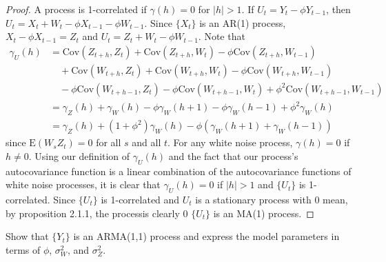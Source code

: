 \documentclass[12pt]{article}
\theoremstyle{definition}
\newenvironment{custompbm}[1]
  {\renewcommand\theproblem{#1}\problem}
  {\endproblem}
\newcommand{\E}{\text{E}}
\newcommand{\Co}[2]{\text{Cov}\left({#1}, {#2}\right)}
\begin{document}
\begin{proof}
  A process is 1-correlated if $\gamma(h) = 0$ for $|h| > 1$.
  If $U_t = Y_t - \phi Y_{t-1}$, then $U_t = X_t + W_t - \phi X_{t-1} - \phi W_{t-1}$.
  Since $\{X_t\}$ is an AR(1) process, $X_t - \phi X_{t-1} = Z_t$ and
  $U_t = Z_t + W_t - \phi W_{t-1}$. Note that
  \begin{align*}
    \gamma_U(h) &= \Co{Z_{t+h}}{Z_t} + \Co{Z_{t+h}}{W_{t}} -\phi \Co{Z_{t+h}}{W_{t-1}}\\
    &\quad + \Co{W_{t+h}}{Z_t} + \Co{W_{t+h}}{W_t} - \phi \Co{W_{t+h}}{W_{t-1}} \\
    &\quad -\phi \Co{W_{t+h-1}}{Z_t} -\phi\Co{W_{t+h-1}}{W_t} + \phi^2 \Co{W_{t+h-1}}{W_{t-1}}\\
    &= \gamma_Z(h) + \gamma_W(h) -\phi\gamma_W(h+1) -\phi\gamma_W(h-1) + \phi^2 \gamma_W(h)\\
    &= \gamma_Z(h) + (1 + \phi^2)\gamma_W(h) - \phi(\gamma_W(h+1) + \gamma_W(h-1))
  \end{align*}
  since $\E(W_sZ_t) = 0$ for all $s$ and all $t$. For any white noise process,
  $\gamma(h) = 0$ if $h \neq 0$. Using our definition of $\gamma_U(h)$ and the fact
  that our process's autocovariance function is a linear combination of the
  autocovariance functions of white noise processes, it is clear that $\gamma_U(h) = 0$ if $|h| > 1$
  and $\{U_t\}$ is 1-correlated. Since $\{U_t\}$ is 1-correlated and
  $U_t$ is a stationary process with 0 mean, by proposition 2.1.1, the processis clearly 0
  $\{U_t\}$ is an MA(1) process.
\end{proof}


\begin{custompbm}{3.c}
  Show that $\{Y_t\}$ is an ARMA(1,1) process and express the model parameters
  in terms of $\phi$, $\sigma_W^2$, and $\sigma_Z^2$.
\end{custompbm}
\end{document}
